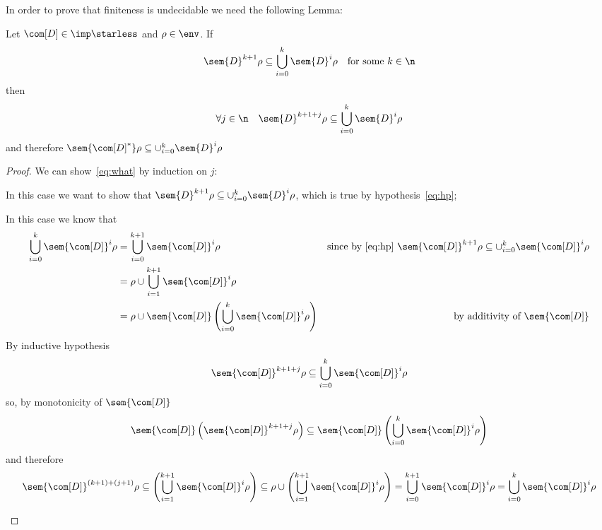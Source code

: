 In order to prove that finiteness is undecidable we need the following
Lemma:

\begin{lemma}\label{le:contain}
  Let \(\com[D] \in \imp\starless\) and \(\rho \in \env\). If
  \begin{equation}\label{eq:hp}
    \sem{D}^{k+1}\rho \subseteq \bigcup_{i=0}^k\sem{D}^i\rho \quad \text{for some } k \in \n
  \end{equation}
  then
  \begin{equation}\label{eq:what}
    \forall j \in \n \quad \sem{D}^{k+1+j}\rho \subseteq \bigcup_{i=0}^k\sem{D}^i\rho
  \end{equation}
  and therefore
  \(\sem{{\com[D]}^*}\rho \subseteq \cup_{i=0}^k\sem{D}^i\rho\)
\end{lemma}
\begin{proof}
  We can show~\eqref{eq:what} by induction on \(j\):
  \begin{inductive}
     In this case we want to show that
    \(\sem{D}^{k+1}\rho \subseteq \cup_{i=0}^k\sem{D}^i\rho\), which
    is true by hypothesis~\eqref{eq:hp};
    
     In this case we know that
    \begin{align*}
      \bigcup_{i=0}^k\sem{\com[D]}^i\rho & = \bigcup_{i=0}^{k+1}\sem{\com[D]}^i\rho & \text{since by \eqref{eq:hp} } \sem{\com[D]}^{k+1}\rho \subseteq \cup_{i=0}^k\sem{\com[D]}^i\rho \\
                                         & = \rho \cup \bigcup _{i=1}^{k+1}\sem{\com[D]}^i \rho \\
                                         & = \rho \cup \sem{\com[D]}\left( \bigcup _{i=0}^k\sem{\com[D]}^i \rho\right) & \text{by additivity of } \sem{\com[D]}
    \end{align*}
    By inductive hypothesis
    \begin{equation*}
      \sem{\com[D]}^{k+1+j}\rho \subseteq \bigcup_{i=0}^k\sem{\com[D]}^i\rho
    \end{equation*}
    so, by monotonicity of \(\sem{\com[D]}\)
    \begin{equation*}
      \sem{\com[D]}\left( \sem{\com[D]}^{k+1+j}\rho\right) \subseteq \sem{\com[D]}\left(\bigcup_{i=0}^k\sem{\com[D]}^i\rho \right)
    \end{equation*}
    and therefore
    \begin{equation*}
      \sem{\com[D]}^{(k+1)+(j+1)}\rho \subseteq \left(\bigcup_{i=1}^{k+1}\sem{\com[D]}^i\rho \right) \subseteq \rho \cup \left(\bigcup_{i=1}^{k+1}\sem{\com[D]}^i\rho \right) = \bigcup_{i=0}^{k+1}\sem{\com[D]}^i\rho = \bigcup_{i=0}^{k}\sem{\com[D]}^i\rho
    \end{equation*}
  \end{inductive}
\end{proof}


